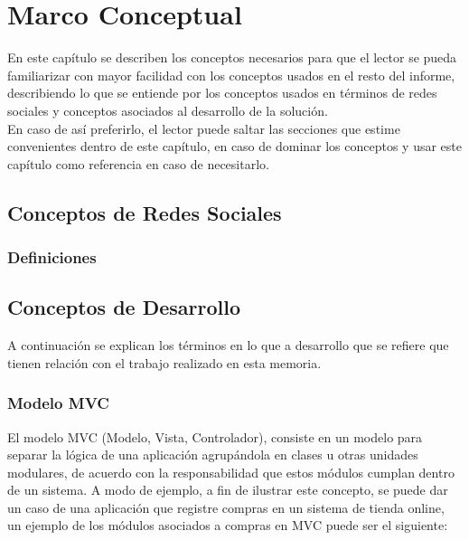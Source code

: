 \chapter{Marco Conceptual}

En este capítulo se describen los conceptos necesarios para que el lector se pueda familiarizar con mayor facilidad con los conceptos usados en el resto del informe, describiendo lo que se entiende por los conceptos usados en términos de redes sociales y conceptos asociados al desarrollo de la solución.\\

En caso de así preferirlo, el lector puede saltar las secciones que estime convenientes dentro de este capítulo, en caso de dominar los conceptos y usar este capítulo como referencia en caso de necesitarlo.

\section{Conceptos de Redes Sociales} %
\label{sec:conceptos_de_redes_sociales}

\subsection{Definiciones} %
\label{sub:definiciones}


\section{Conceptos de Desarrollo} %
\label{sec:conceptos_de_desarrollo}

A continuación se explican los términos en lo que a desarrollo que se refiere que tienen relación con el trabajo realizado en esta memoria.

\subsection{Modelo MVC} %
\label{sub:modelo_mvc}
El modelo MVC (Modelo, Vista, Controlador)\cite{mvc}, consiste en un modelo para separar la lógica de una aplicación agrupándola en clases u otras unidades modulares, de acuerdo con la responsabilidad que estos módulos cumplan dentro de un sistema. A modo de ejemplo, a fin de ilustrar este concepto, se puede dar un caso de una aplicación que registre compras en un sistema de tienda online, un ejemplo de los módulos asociados a compras en MVC puede ser el siguiente:

